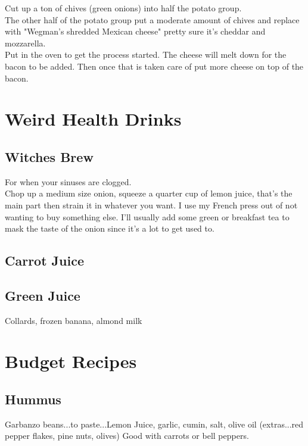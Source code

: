 \documentclass{article}
\begin{document}
Cut up a ton of chives (green onions) into half the potato group. \\ 
The other half of the potato group put a moderate amount of chives and replace with "Wegman's shredded Mexican cheese" pretty sure it's cheddar and mozzarella. \\ 
Put in the oven to get the process started. The cheese will melt down for the bacon to be added. Then once that is taken care of put more cheese on top of the bacon. \\ 



\section*{Weird Health Drinks}

\subsection*{Witches Brew} 
For when your sinuses are clogged. \\ 
Chop up a medium size onion, squeeze a quarter cup of lemon juice, that's the main part then strain it in whatever you want. I use my French press out of not wanting to buy something else. I'll usually add some green or breakfast tea to mask the taste of the onion since it's a lot to get used to. 

\subsection*{Carrot Juice} 

\subsection*{Green Juice}
Collards, frozen banana, almond milk 

\section*{Budget Recipes}

\subsection*{Hummus}
Garbanzo beans...to paste...Lemon Juice, garlic, cumin, salt, olive oil (extras...red pepper flakes, pine nuts, olives)
Good with carrots or bell peppers.
\end{document}
